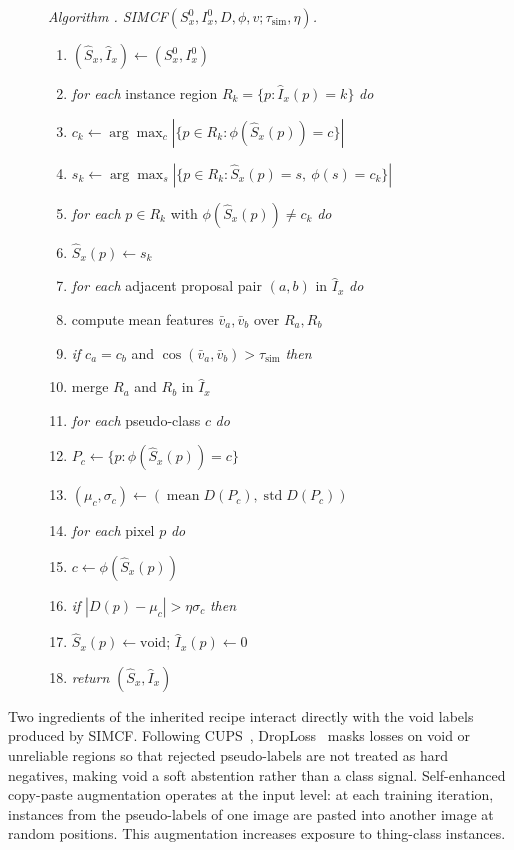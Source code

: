 \documentclass{article}
\newcounter{algorithm}
\newenvironment{cvpralgorithm}{\begin{figure}[tbp]\refstepcounter{algorithm}\noindent\begin{minipage}{\linewidth}}{\end{minipage}\end{figure}}
\newcommand{\algorithmcaption}[1]{\noindent\emph{Algorithm \thealgorithm. #1}\par\vspace{2pt}}
\newcommand{\algkw}[1]{\emph{#1}}
\newcommand{\algindent}{\hspace*{1.2em}}
\newcommand{\algindenttwo}{\hspace*{2.4em}}
\begin{document}
\begin{cvpralgorithm}
\algorithmcaption{SIMCF$(S_x^0,I_x^0,D,\phi,v;\tau_\text{sim},\eta)$.}
\label{alg:simcf}
\begin{enumerate}
\setlength{\itemsep}{0pt}
\setlength{\topsep}{2pt}
\item $(\hat S_x,\hat I_x) \gets (S_x^0,I_x^0)$
\item \algkw{for each} instance region $R_k=\{p:\hat I_x(p)=k\}$ \algkw{do}
\item \algindent $c_k \gets \arg\max_c |\{p\in R_k:\phi(\hat S_x(p))=c\}|$
\item \algindent $s_k \gets \arg\max_s |\{p\in R_k:\hat S_x(p)=s,\ \phi(s)=c_k\}|$
\item \algindent \algkw{for each} $p\in R_k$ with $\phi(\hat S_x(p))\ne c_k$ \algkw{do}
\item \algindenttwo $\hat S_x(p)\gets s_k$
\item \algkw{for each} adjacent proposal pair $(a,b)$ in $\hat I_x$ \algkw{do}
\item \algindent compute mean features $\bar v_a,\bar v_b$ over $R_a,R_b$
\item \algindent \algkw{if} $c_a=c_b$ and $\cos(\bar v_a,\bar v_b)>\tau_\text{sim}$ \algkw{then}
\item \algindenttwo merge $R_a$ and $R_b$ in $\hat I_x$
\item \algkw{for each} pseudo-class $c$ \algkw{do}
\item \algindent $P_c\gets\{p:\phi(\hat S_x(p))=c\}$
\item \algindent $(\mu_c,\sigma_c)\gets(\operatorname{mean}D(P_c),\operatorname{std}D(P_c))$
\item \algkw{for each} pixel $p$ \algkw{do}
\item \algindent $c\gets\phi(\hat S_x(p))$
\item \algindent \algkw{if} $|D(p)-\mu_c|>\eta\sigma_c$ \algkw{then}
\item \algindenttwo $\hat S_x(p)\gets\mathrm{void}$; \quad $\hat I_x(p)\gets0$
\item \algkw{return} $(\hat S_x,\hat I_x)$
\end{enumerate}
\end{cvpralgorithm}

Two ingredients of the inherited recipe interact directly with the void labels produced by SIMCF. Following CUPS~\cite{hahn2025cups}, DropLoss~\cite{wang2023cutler} masks losses on void or unreliable regions so that rejected pseudo-labels are not treated as hard negatives, making void a soft abstention rather than a class signal. Self-enhanced copy-paste augmentation operates at the input level: at each training iteration, instances from the pseudo-labels of one image are pasted into another image at random positions. This augmentation increases exposure to thing-class instances.
\end{document}
